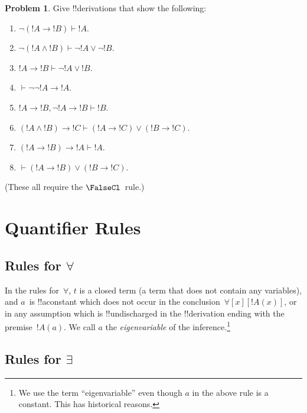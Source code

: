 \documentclass[10pt,a4paper]{article}
\theoremstyle{plain}
\theoremstyle{definition}
\newtheorem{prob}{Problem}[section]
\theoremstyle{remark}
\newcommand*{\olfileid}[3]{}
\newcommand*{\olsection}[1]{\section*{#1}}
\providecommand{\AxiomC}[1]{}
\providecommand{\UnaryInfC}[1]{}
\providecommand{\RightLabel}[1]{}
\providecommand{\DisplayProof}{}
\providecommand{\lif}{\mathbin{\rightarrow}}
\providecommand{\lforall}{\mathord{\forall}}
\providecommand{\lexists}{\mathord{\exists}}
\providecommand{\Proves}{\mathrel{\vdash}}
\providecommand{\Elim}[1]{}
\providecommand{\Intro}[1]{}
\providecommand{\Atom}{\mathrm{Atom}}
\providecommand{\Intro}{\mathrm{I}}
\begin{document}
\begin{prob}
Give !!{derivation}s that show the following:
\begin{enumerate}
\item $\lnot(!A \lif !B) \Proves !A$.
\item $\lnot(!A \land !B) \Proves \lnot !A \lor \lnot !B$.
\item $!A \lif !B \Proves \lnot !A \lor !B$.
\item $\Proves \lnot \lnot !A \lif !A$.
\item $!A \lif !B, \lnot !A \lif !B \Proves !B$.
\item $(!A \land !B) \lif !C \Proves (!A \lif !C) \lor (!B \lif !C)$.
\item $(!A \lif !B) \lif !A \Proves !A$.
\item $\Proves (!A \lif !B) \lor (!B \lif !C)$.
\end{enumerate}
(These all require the $\FalseCl$~rule.)
\end{prob}





\olfileid{fol}{ntd}{qrl}

\olsection{Quantifier Rules}

\subsection{Rules for $\lforall$}

\begin{defish}
\AxiomC{$!A(a)$}
\RightLabel{\Intro{\lforall}}
\UnaryInfC{$\lforall[x][\Atom{!A}{x}]$}
\DisplayProof
\hfill
\AxiomC{$\lforall[x][\Atom{!A}{x}]$}
\RightLabel{\Elim{\lforall}}
\UnaryInfC{$!A(t)$}
\DisplayProof
\end{defish}

In the rules for~$\lforall$, $t$ is a closed term (a term that does
not contain any variables), and $a$~is !!a{constant} which does not
occur in the conclusion~$\lforall[x][!A(x)]$, or in any assumption
which is !!{undischarged} in the !!{derivation} ending with the
premise~$!A(a)$. We call $a$ the \emph{eigenvariable} of the
\Intro{\lforall} inference.\footnote{We use the term ``eigenvariable''
even though $a$ in the above rule is a constant. This has historical
reasons.}

\subsection{Rules for $\lexists$}
\end{document}
